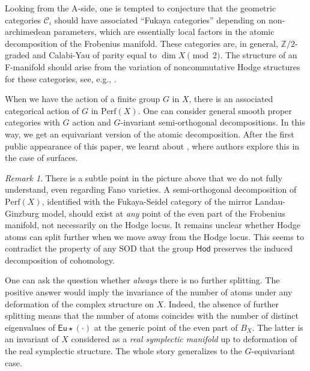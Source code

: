 \documentclass[12pt,a4paper]{amsart}
\theoremstyle{definition}
\theoremstyle{remark}
\newtheorem{remark}[theorem]{Remark}
\newcommand{\Z}{\mathbb{Z}}
\newcommand{\Perf}{\mathrm{Perf}}
\begin{document}
Looking from the A-side, one is tempted to conjecture that the geometric categories $\mathcal{C}_i$ should have associated ``Fukaya categories'' depending on non-archimedean parameters, which are essentially local factors in the atomic decomposition of the Frobenius manifold. These categories are, in general, $\Z/2$-graded and Calabi-Yau of parity equal to $\dim X\pmod 2$. The structure of an F-manifold should arise from the variation of noncommutative Hodge structures for these categories, see, e.g., \cite{KatzarkovKontsevichPantev2008}.

When we have the action of a finite group $G$ in $X$, there is an associated categorical action of $G$ in $\mathrm{Perf}(X)$. One can consider general smooth proper categories with $G$ action and $G$-invariant semi-orthogonal decompositions. In this way, we get an equivariant version of the atomic decomposition. After the first public appearance of this paper, we learnt about \cite{ElaginSchneiderShinder}, where authors explore this in the case of surfaces.

\begin{remark}  
      There is a subtle point in the picture above that we do not fully understand, even regarding Fano varieties. A semi-orthogonal decomposition of $\Perf(X)$, identified with the Fukaya-Seidel category of the mirror Landau-Ginzburg model, should exist at \emph{any}  point of the even part of the Frobenius manifold, not necessarily on the Hodge locus. It remains unclear whether Hodge atoms can split further when we move away from the Hodge locus. This seems to contradict the property of any SOD that the group $\mathsf{Hod}$ preserves the induced decomposition of cohomology.  
      
      One can ask the question whether \emph{always} there is no further splitting. The positive answer would imply the invariance of the number of atoms under any deformation of the complex structure on $X$. Indeed, the absence of further splitting means that the number of atoms coincides with the number of distinct eigenvalues of $\mathsf{Eu}\star (\cdot)$ at the generic point of the even part of $B_X$. The latter is an invariant of $X$ considered as a \emph{real symplectic manifold} up to deformation of the real symplectic structure. The whole story generalizes to the  $G$-equivariant case.
  \label{rem:question}     
\end{remark}
\end{document}
